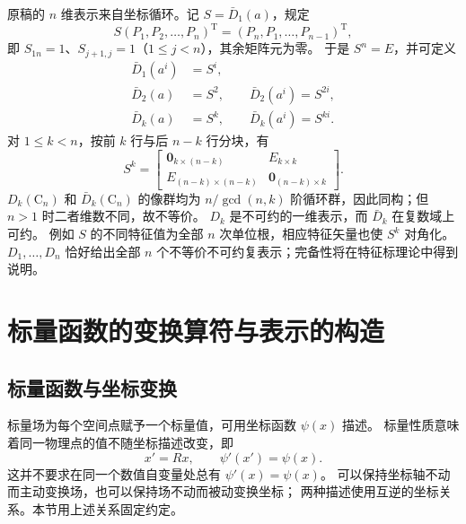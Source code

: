 原稿的 $n$ 维表示来自坐标循环。记 $S=\bar D_1\left(a\right)$，规定
\begin{equation}
S\left(P_1,P_2,\ldots,P_n\right)^{\mathrm{T}}
=\left(P_n,P_1,\ldots,P_{n-1}\right)^{\mathrm{T}},
\end{equation}
即 $S_{1n}=1$、$S_{j+1,j}=1$（$1\leqslant j<n$），其余矩阵元为零。
于是 $S^n=E$，并可定义
\begin{align}
\bar D_1\left(a^i\right)&=S^i,\\
\bar D_2\left(a\right)&=S^2,\qquad \bar D_2\left(a^i\right)=S^{2i},\\
\bar D_k\left(a\right)&=S^k,\qquad \bar D_k\left(a^i\right)=S^{ki}.
\end{align}
对 $1\leqslant k<n$，按前 $k$ 行与后 $n-k$ 行分块，有
\begin{equation}
S^k=\begin{bmatrix}
\bm{0}_{k\times\left(n-k\right)}&E_{k\times k}\\
E_{\left(n-k\right)\times\left(n-k\right)}&\bm{0}_{\left(n-k\right)\times k}
\end{bmatrix}.
\end{equation}
$D_k\left(\mathrm{C}_n\right)$ 和 $\bar D_k\left(\mathrm{C}_n\right)$ 的像群均为
$n/\gcd\left(n,k\right)$ 阶循环群，因此同构；但 $n>1$ 时二者维数不同，故不等价。
$D_k$ 是不可约的一维表示，而 $\bar D_k$ 在复数域上可约。
例如 $S$ 的不同特征值为全部 $n$ 次单位根，相应特征矢量也使 $S^k$ 对角化。
$D_1,\ldots,D_n$ 恰好给出全部 $n$ 个不等价不可约复表示；完备性将在特征标理论中得到说明。

\section{标量函数的变换算符与表示的构造}
\subsection{标量函数与坐标变换}
标量场为每个空间点赋予一个标量值，可用坐标函数 $\psi\left(x\right)$ 描述。
标量性质意味着同一物理点的值不随坐标描述改变，即
\begin{equation}
x'=Rx,\qquad \psi'\left(x'\right)=\psi\left(x\right).
\end{equation}
这并不要求在同一个数值自变量处总有 $\psi'\left(x\right)=\psi\left(x\right)$。
可以保持坐标轴不动而主动变换场，也可以保持场不动而被动变换坐标；
两种描述使用互逆的坐标关系。本节用上述关系固定约定。

